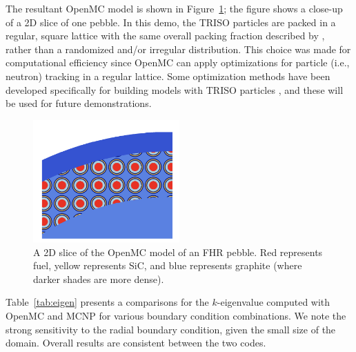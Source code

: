The resultant OpenMC model is shown in Figure~\ref{f:openmc_pebble}; the figure shows a close-up of a 2D slice of one pebble.  In this demo, the TRISO particles are packed in a regular, square lattice with the same overall packing fraction described by \cite{phillips2010}, rather than a randomized and/or irregular distribution.  This choice was made for computational efficiency since OpenMC can apply optimizations for particle (i.e., neutron) tracking in a regular lattice.  Some optimization methods have been developed specifically for building models with TRISO particles \cite{openmcdocs_triso}, and these will be used for future demonstrations.

\begin{figure}[!h]
\centering
\includegraphics[clip=true,width=0.5\textwidth]{Figures/pebble_yz_cropped.png}
\caption{A 2D slice of the OpenMC model of an FHR pebble.  Red represents fuel, yellow represents
SiC, and blue represents graphite (where darker shades are more dense).}
\label{f:openmc_pebble}
\end{figure}

Table~\ref{tab:eigen} presents a comparisons for the $k$-eigenvalue computed with OpenMC and MCNP for various boundary condition combinations. We note the strong sensitivity to the radial boundary condition, given the small size of the domain. Overall results are consistent between the two codes.

